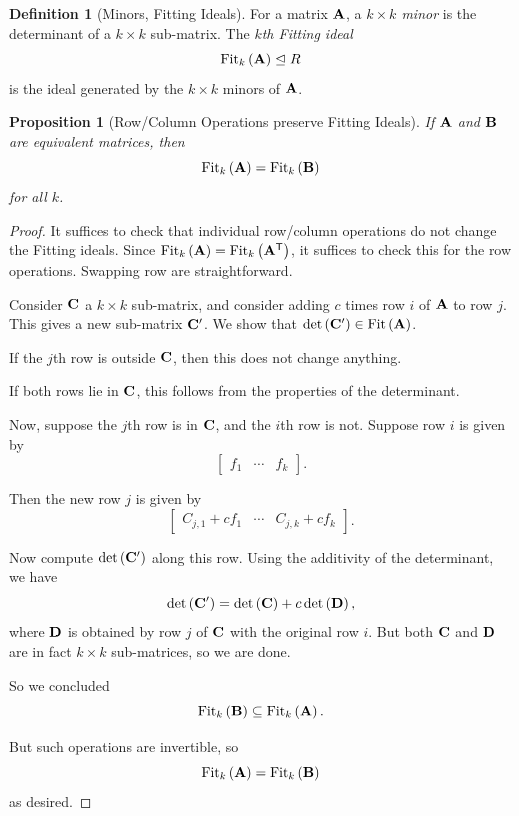 \documentclass{article}
\newtheorem{proposition}[theorem]{Proposition}
\theoremstyle{definition}
\newtheorem{definition}[theorem]{Definition}
\theoremstyle{remark}
\newcommand{\pqty}[1]{\left(#1\right)}
\newcommand{\bmqty}[1]{\begin{bmatrix}#1\end{bmatrix}}
\newcommand{\transpose}{^{\mathsf{T}}}
\newcommand{\idealsub}{\trianglelefteq}
\newcommand{\Fit}{\operatorname{Fit}}
\begin{document}
\begin{definition}[Minors, Fitting Ideals]
    \label{def:minor-fit-ideals}%
    For a matrix \(\vb{A}\), a \emph{\(k \times k\) minor} is the determinant of a \(k \times k\) sub-matrix. The \emph{\(k\)th Fitting ideal}
    \[
        \Fit_k \pqty{\vb{A}} \idealsub R
    \]
    is the ideal generated by the \(k \times k\) minors of \(\vb{A}\).
\end{definition}

\begin{proposition}[Row/Column Operations preserve Fitting Ideals]
    \label{prop:row-column-operations-preserve-fit}%
    If \(\vb{A}\) and \(\vb{B}\) are equivalent matrices, then
    \[
        \Fit_k \pqty{\vb{A}} = \Fit_k \pqty{\vb{B}}
    \]
    for all \(k\).
\end{proposition}

\begin{proof}
    It suffices to check that individual row/column operations do not change the Fitting ideals. Since \(\Fit_k\pqty{\vb{A}} = \Fit_k\pqty{\vb{A}\transpose}\), it suffices to check this for the row operations. Swapping row are straightforward.

    Consider \(\vb{C}\) a \(k \times k\) sub-matrix, and consider adding \(c\) times row \(i\) of \(\vb{A}\) to row \(j\). This gives a new sub-matrix \(\vb{C}'\). We show that \(\det\pqty{\vb{C}'} \in \Fit\pqty{\vb{A}}\).

    If the \(j\)th row is outside \(\vb{C}\), then this does not change anything.

    If both rows lie in \(\vb{C}\), this follows from the properties of the determinant.

    Now, suppose the \(j\)th row is in \(\vb{C}\), and the \(i\)th row is not. Suppose row \(i\) is given by
    \[
        \bmqty{
            f_1 & \cdots & f_k
        }.
    \]

    Then the new row \(j\) is given by
    \[
        \bmqty{
            C_{j, 1} + c f_1 & \cdots & C_{j, k} + c f_k
        }.
    \]

    Now compute \(\det \pqty{\vb{C}'}\) along this row. Using the additivity of the determinant, we have
    \[
        \det\pqty{\vb{C}'} = \det\pqty{\vb{C}} + c \det\pqty{\vb{D}},
    \]
    where \(\vb{D}\) is obtained by row \(j\) of \(\vb{C}\) with the original row \(i\). But both \(\vb{C}\) and \(\vb{D}\) are in fact \(k \times k\) sub-matrices, so we are done.

    So we concluded
    \[
        \Fit_k \pqty{\vb{B}} \subseteq \Fit_k \pqty{\vb{A}}.
    \]

    But such operations are invertible, so
    \[
        \Fit_k \pqty{\vb{A}} = \Fit_k \pqty{\vb{B}}
    \]
    as desired.
\end{proof}
\end{document}
